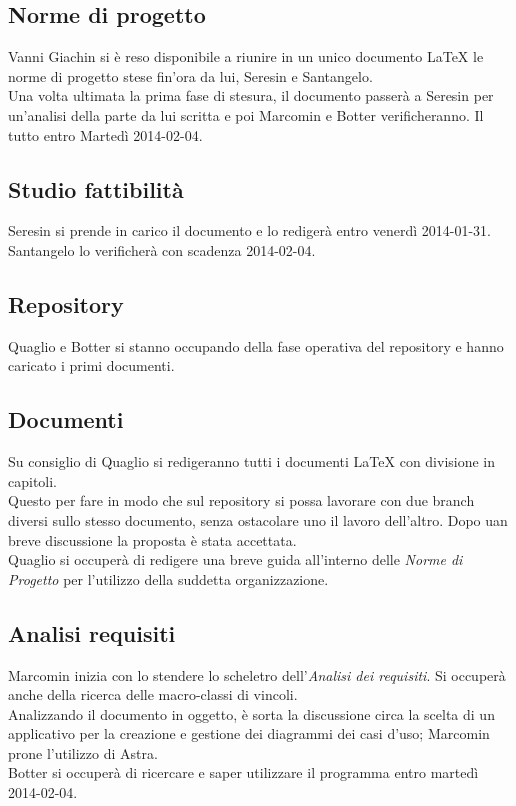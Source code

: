 \subsection{Norme di progetto}
Vanni Giachin si è reso disponibile a riunire in un unico documento \LaTeX{} le norme di progetto stese fin'ora da lui, Seresin e Santangelo.\\
Una volta ultimata la prima fase di stesura, il documento passerà a Seresin per un'analisi della parte da lui scritta e poi Marcomin e Botter verificheranno. Il tutto entro Martedì 2014-02-04.
\subsection{Studio fattibilità}
Seresin si prende in carico il documento e lo redigerà entro venerdì 2014-01-31.\\
Santangelo lo verificherà con scadenza 2014-02-04.\\
\subsection{Repository}
Quaglio e Botter si stanno occupando della fase operativa del repository e hanno caricato i primi documenti.\\
\subsection{Documenti}
Su consiglio di Quaglio si redigeranno tutti i documenti \LaTeX{} con divisione in capitoli.\\
Questo per fare in modo che sul repository si possa lavorare con due branch diversi sullo stesso documento, senza ostacolare uno il lavoro dell'altro.
Dopo uan breve discussione la proposta è stata accettata.\\
Quaglio si occuperà di redigere una breve guida all'interno delle \emph{Norme di Progetto} per l'utilizzo della suddetta organizzazione.\\
\subsection{Analisi requisiti}
Marcomin inizia con lo stendere lo scheletro dell'\emph{Analisi dei requisiti}.
Si occuperà anche della ricerca delle macro-classi di vincoli.\\
Analizzando il documento in oggetto, è sorta la discussione circa la scelta di un applicativo per la creazione e gestione dei diagrammi dei casi d'uso; Marcomin prone l'utilizzo di Astra.\\
Botter si occuperà di ricercare e saper utilizzare il programma entro martedì 2014-02-04.\\